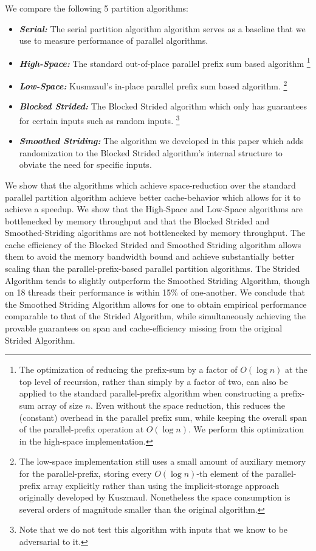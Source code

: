 \documentclass[11pt]{article}
\newcommand{\defn}[1]{{\textit{\textbf{\boldmath #1}}} }
\theoremstyle{remark}
\theoremstyle{remark}
\begin{document}
We compare the following 5 partition algorithms:
\begin{itemize}
	\item \defn{Serial:} The serial partition algorithm algorithm serves as a baseline that we use to measure performance of parallel algorithms. 
	\item \defn{High-Space:} The standard out-of-place parallel prefix sum based algorithm \footnote{The optimization of reducing the prefix-sum by a factor of $O(\log n)$ at the top level of recursion, rather than simply by a factor of two, can also be applied to the standard parallel-prefix algorithm when constructing a prefix-sum array of size $n$. Even without the space reduction, this reduces the (constant) overhead in the parallel prefix sum, while keeping the overall span of the parallel-prefix operation at $O(\log n)$. We perform this optimization in the high-space implementation.}
	\item \defn{Low-Space:} Kusmzaul's in-place parallel prefix sum based algorithm. \footnote{The low-space implementation still uses a small amount of auxiliary memory for the parallel-prefix, storing every $O(\log n)$-th element of the parallel-prefix array explicitly rather than using the implicit-storage approach originally developed by Kuszmaul. Nonetheless the space consumption is several orders of magnitude smaller than the original algorithm.}
	\item \defn{Blocked Strided:} The Blocked Strided algorithm which only has guarantees for certain inputs such as random inputs. \footnote{Note that we do not test this algorithm with inputs that we know to be adversarial to it.}
	\item \defn{Smoothed Striding:} The algorithm we developed in this paper which adds randomization to the Blocked Strided algorithm's internal structure to obviate the need for specific inputs.
\end{itemize}
We show that the algorithms which achieve space-reduction over the standard parallel partition algorithm achieve better cache-behavior which allows for it to achieve a speedup.
We show that the High-Space and Low-Space algorithms are bottlenecked by memory throughput and that the Blocked Strided and Smoothed-Striding algorithms are not bottlenecked by memory throughput.
The cache efficiency of the Blocked Strided and Smoothed Striding algorithm allows them to avoid the memory bandwidth bound and achieve substantially better scaling than the parallel-prefix-based parallel partition algorithms.
The Strided Algorithm tends to slightly outperform the Smoothed Striding Algorithm, though on 18 threads their performance is within 15\% of one-another. We conclude that the Smoothed Striding Algorithm allows for one to obtain empirical performance comparable to that of the Strided Algorithm, while simultaneously achieving the provable guarantees on span and cache-efficiency missing from the original Strided Algorithm.
\end{document}
